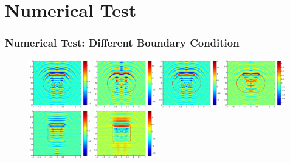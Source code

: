 \documentclass[utf-8,8pt]{beamer}
\begin{document}
\section{Numerical Test}
\begin{frame}
\frametitle{Numerical Test: Different Boundary Condition}
 \begin{figure}
 	\centering
 	\includegraphics[width=0.24\textwidth]{./graphic/peanut_3pi.eps}
 	\includegraphics[width=0.24\textwidth]{./graphic/peanut_3pi_neumann.eps}
 	\includegraphics[width=0.24\textwidth]{./graphic/peanut_3pi_impedance_1.eps}
 	\includegraphics[width=0.24\textwidth]{./graphic/peanut_3pi_transmission.eps}\\
    \includegraphics[width=0.24\textwidth]{./graphic/rectangle_3pi.eps}
 	\includegraphics[width=0.24\textwidth]{./graphic/rectangle_3pi_neumann.eps}

\end{figure}
\end{frame}
\end{document}
